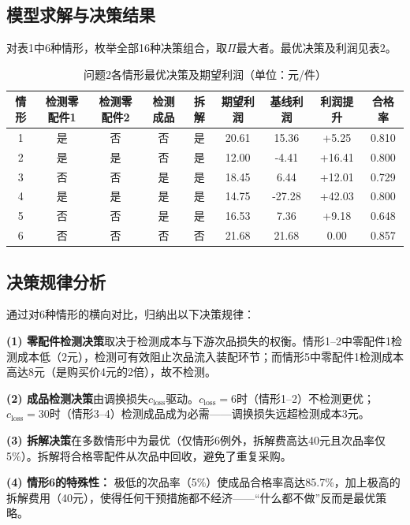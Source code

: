 \documentclass[12pt,a4paper]{ctexart}
\begin{document}
\subsection{模型求解与决策结果}

对表1中6种情形，枚举全部16种决策组合，取$\Pi$最大者。最优决策及利润见表2。

\begin{table}[H]
\centering
\caption{问题2各情形最优决策及期望利润（单位：元/件）}
\small
\begin{tabular}{ccccccccc}
\toprule
\textbf{情形} & \textbf{检测零配件1} & \textbf{检测零配件2} & \textbf{检测成品} & \textbf{拆解} & \textbf{期望利润} & \textbf{基线利润} & \textbf{利润提升} & \textbf{合格率} \\
\midrule
1 & 是 & 否 & 否 & 是 & 20.61 & 15.36 & +5.25 & 0.810 \\
2 & 是 & 是 & 否 & 是 & 12.00 & -4.41 & +16.41 & 0.800 \\
3 & 否 & 否 & 是 & 是 & 18.45 & 6.44 & +12.01 & 0.729 \\
4 & 是 & 是 & 是 & 是 & 14.75 & -27.28 & +42.03 & 0.800 \\
5 & 否 & 否 & 是 & 是 & 16.53 & 7.36 & +9.18 & 0.648 \\
6 & 否 & 否 & 否 & 否 & 21.68 & 21.68 & 0.00 & 0.857 \\
\bottomrule
\end{tabular}
\end{table}

\subsection{决策规律分析}

通过对6种情形的横向对比，归纳出以下决策规律：

\textbf{(1) 零配件检测决策}取决于检测成本与下游次品损失的权衡。情形1--2中零配件1检测成本低（2元），检测可有效阻止次品流入装配环节；而情形5中零配件1检测成本高达8元（是购买价4元的2倍），故不检测。

\textbf{(2) 成品检测决策}由调换损失$c_{\text{loss}}$驱动。$c_{\text{loss}}=6$时（情形1--2）不检测更优；$c_{\text{loss}}=30$时（情形3--4）检测成品成为必需——调换损失远超检测成本3元。

\textbf{(3) 拆解决策}在多数情形中为最优（仅情形6例外，拆解费高达40元且次品率仅5\%）。拆解将合格零配件从次品中回收，避免了重复采购。

\textbf{(4) 情形6的特殊性：} 极低的次品率（5\%）使成品合格率高达85.7\%，加上极高的拆解费用（40元），使得任何干预措施都不经济——``什么都不做''反而是最优策略。
\end{document}
